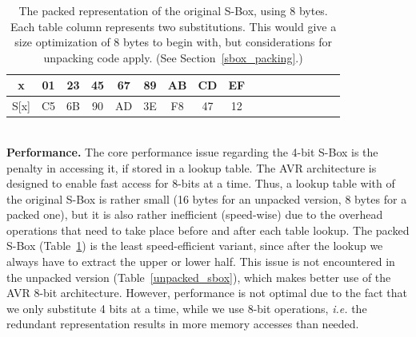 \documentclass[11pt]{article}
\begin{document}
\begin{table}[h]
\centering
\scriptsize
\begin{tabular}{| c | c  | c | c | c  | c | c | c  | c | c | c  | c | c | c  | c | c | c |}
\hline
  x & 01 & 23 & 45 & 67 & 89 & AB & CD & EF   \\
\hline
  S[x] & C5 & 6B & 90 & AD & 3E & F8 & 47 & 12   \\
\hline
\end{tabular}
 \caption{\scriptsize The packed representation of the original S-Box, using 8 bytes. Each table column represents two substitutions. This would give a size optimization of 8 bytes to begin with, but considerations for unpacking code apply. (See Section~\ref{sbox_packing}.)}
 \label{packed_sbox}
\end{table}\\
\textbf{Performance.} The core performance issue regarding the 4-bit S-Box is the penalty in accessing it, if stored in a lookup table. The AVR architecture is designed to enable fast access for 8-bits at a time. Thus, a lookup table with of the original S-Box is rather small (16 bytes for an unpacked version, 8 bytes for a packed one), but it is also rather inefficient (speed-wise) due to the overhead operations that need to take place before and after each table lookup. The packed S-Box (Table~\ref{packed_sbox}) is the least speed-efficient variant, since after the lookup we always have to extract the upper or lower half. This issue is not encountered in the unpacked version (Table~\ref{unpacked_sbox}), which makes better use of the AVR 8-bit architecture. However, performance is not optimal  due to the fact that we only substitute 4 bits at a time, while we use 8-bit operations, \emph{i.e.} the redundant representation results in more memory accesses than needed. 
\end{document}
